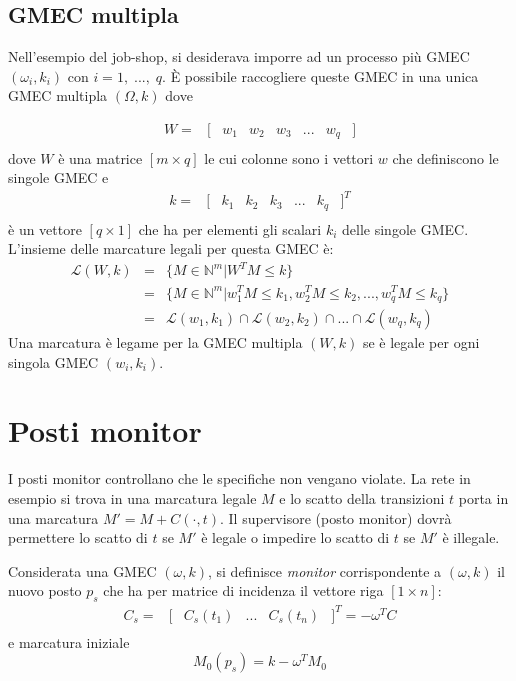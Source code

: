 \documentclass[a4paper]{report}
\begin{document}
\subsection{GMEC multipla}
Nell'esempio del job-shop, si desiderava imporre ad un processo pi\`u
GMEC $(\omega_i, k_i)$ con $i = 1,\;...,\;q$. \`E possibile raccogliere
queste GMEC in una unica GMEC multipla $(\Omega, k)$ dove 

\[
\begin{array}{cccccccc}
  W = & [ & w_1 & w_2 & w_3 & ... & w_q & ]\\
\end{array}
\]
dove $W$ \`e una matrice $[m \times q]$ le cui colonne sono i vettori
$w$ che definiscono le singole GMEC e
\[
\begin{array}{cccccccc}
  k = & [ & k_1 & k_2 & k_3 & ... & k_q & ]^T\\
\end{array}
\]
\`e un vettore $[q \times 1]$ che ha per elementi gli scalari $k_i$
delle singole GMEC.
L'insieme delle marcature legali per questa GMEC \`e:
\[
\begin{array}{ccc}
\mathcal{L}(W,k) & = & \{ M \in \mathbb{N}^m | W^T M \leq k\}\\
 & = & \{ M \in \mathbb{N}^m | w_1^T M \leq k_1, w_2^T M \leq k_2,
..., w_q^T M \leq k_q \}\\
 & = & \mathcal{L} (w_1, k_1) \cap \mathcal{L} (w_2, k_2) \cap
... \cap \mathcal{L} (w_q, k_q)
\end{array}
\]
Una marcatura \`e legame per la GMEC multipla $(W,k)$ se \`e legale per ogni
singola GMEC $(w_i, k_i)$.

\section{Posti monitor}
I posti monitor controllano che le specifiche non vengano
violate. La rete in esempio si trova in una marcatura legale $M$ e lo
scatto della transizioni $t$ porta in una marcatura $M' = M + C(\cdot,
t)$. Il supervisore (posto monitor) dovr\`a permettere lo scatto di $t$
se $M'$ \`e legale o impedire lo scatto di $t$ se $M'$ \`e illegale.

Considerata una GMEC $(\omega,k)$, si definisce {\em monitor}
corrispondente a $(\omega,k)$ il nuovo posto $p_s$ che ha per matrice di
incidenza il vettore riga $[1 \times n]$:
\[
\begin{array}{cccccc}
  C_s = & [ & C_s(t_1) & ... & C_s(t_n) & ]^T = -\omega^T C\\
\end{array}
\]
e marcatura iniziale
\[
M_0(p_s) = k - \omega^T M_0
\]
\end{document}
